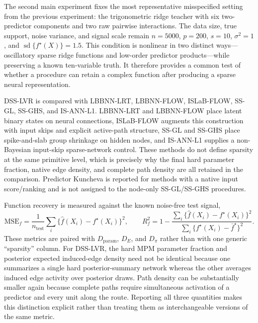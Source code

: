 The second main experiment fixes the most representative misspecified setting from the previous experiment: the trigonometric ridge teacher with six two-predictor components and two raw pairwise interactions. The data size, true support, noise variance, and signal scale remain $n=5000$, $p=200$, $s=10$, $\sigma^2=1$, and $\operatorname{sd}\{f^\star(X)\}=1.5$. This condition is nonlinear in two distinct ways---oscillatory sparse ridge functions and low-order predictor products---while preserving a known ten-variable truth. It therefore provides a common test of whether a procedure can retain a complex function after producing a sparse neural representation.

DSS-LVR is compared with LBBNN-LRT, LBBNN-FLOW, ISLaB-FLOW, SS-GL, SS-GHS, and IS-ANN-L1. LBBNN-LRT and LBBNN-FLOW place latent binary states on neural connections, ISLaB-FLOW augments this construction with input skips and explicit active-path structure, SS-GL and SS-GHS place spike-and-slab group shrinkage on hidden nodes, and IS-ANN-L1 supplies a non-Bayesian input-skip sparse-network control. These methods do not define sparsity at the same primitive level, which is precisely why the final hard parameter fraction, native edge density, and complete path density are all retained in the comparison. Predictor Kuncheva is reported for methods with a native input score/ranking and is not assigned to the node-only SS-GL/SS-GHS procedures.

Function recovery is measured against the known noise-free test signal,
\[
\mathrm{MSE}_f=\frac{1}{n_{\mathrm{test}}}\sum_i\{\widehat f(X_i)-f^\star(X_i)\}^2,
\qquad
R_f^2=1-\frac{\sum_i\{\widehat f(X_i)-f^\star(X_i)\}^2}
{\sum_i\{f^\star(X_i)-\bar f^\star\}^2}.
\]
These metrics are paired with $D_{\mathrm{param}}$, $D_E$, and $D_\pi$ rather than with one generic ``sparsity'' column. For DSS-LVR, the hard MPM parameter fraction and posterior expected induced-edge density need not be identical because one summarizes a single hard posterior-summary network whereas the other averages induced edge activity over posterior draws. Path density can be substantially smaller again because complete paths require simultaneous activation of a predictor and every unit along the route. Reporting all three quantities makes this distinction explicit rather than treating them as interchangeable versions of the same metric.

